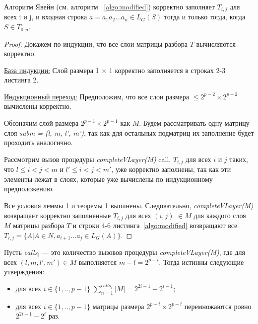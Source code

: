 \begin{theorem}
Алгоритм Явейн (см. алгоритм ~\ref{algo:modified}) корректно заполняет $T_{i, j}$ для всех i и j, и входная строка $a = a_{1}a_{2} \dots a_{n} \in L_{G}(S)$ тогда и только тогда, когда $S \in T_{0, n}$.
\end{theorem}

\begin{proof}

Докажем по индукции, что все слои матрицы разбора $T$ вычисляются корректно.

\underline{База индукции:} Слой размера 1 × 1 корректно заполняется в строках 2-3 листинга 2.

\underline{Индукционный переход:} Предположим, что все слои размера $\le 2^{p - 2} \times 2^{p - 2}$ вычислены корректно.

Обозначим слой размера $2^{p - 1} \times 2^{p - 1}$ как $M$. Будем рассматривать одну матрицу слоя \textit{subm = (l, m, l', m')}, так как для остальных подматриц их заполнение будет проходить аналогично.

Рассмотрим вызов процедуры \textit{completeVLayer(M)} call.
$T_{i,j}$ для всех $i$ и $j$ таких, что $l \leq i < j < m$ и $l' \leq i < j < m'$, уже корректно заполнены, так как эти элементы лежат в слоях, которые уже вычислены по индукционному предположению.

Все условия леммы 1 и теоремы 1 выплнены. Следовательно, \textit{completeVLayer(M)} возвращает корректно заполненные $T_{i, j}$ для всех $(i, j)$ $\in M$ для каждого слоя $M$ матрицы разбора $T$ и строки 4-6 листинга~\ref{algo:modified} возвращают все $T_{i, j} =  \{ A | A \in N, a_{i + 1} \dots a_{j} \in L_{G}(A)\}$.

\end{proof}

\begin{lemma}
Пусть \textit{calls$_{i}$} --- это количество вызовов процедуры \textit{completeVLayer(M)}, где для всех $(l, m, l', m') \in M$ выполняется $m - l = 2^{p - i}$. Тогда истинны следующие утверждения:
\begin{itemize}
 \item для всех $i \in \{ 1, .., p - 1\}$  $\sum_{n=1}^{calls_i}{|M|} = 2^{2i - 1} - 2^{i - 1}$;
 \item для всех $ i \in \{ 1, .., p - 1\}$ матрицы размера $2^{p - i} \times 2^{p - i}$ перемножаются ровно $2^{2i - 1} - 2^{i}$ раз.
\end{itemize}
\end{lemma}

